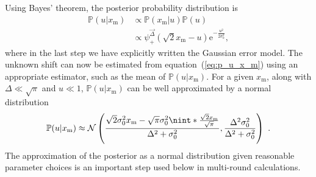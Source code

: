 \documentclass[prx,reprint,superscriptaddress,longbibliography,floatfix,nofootinbib]{revtex4-1}
\DeclarePairedDelimiter{\nint}\lfloor\rceil
\begin{document}
Using Bayes' theorem, the posterior probability distribution is
\begin{equation}
\begin{aligned}
\mathbb{P}(u|x_\text{m}) &\propto \mathbb{P}(x_\text{m}|u) \mathbb{P}(u) \\
&\propto \psi^{\vec{\Delta}}_{+}(\sqrt{2}x_\text{m} - u)\text{e}^{-\frac{u^2}{2\sigma_0^2}},
\end{aligned}
\label{eq:p_u_x_m}
\end{equation}
where in the last step we have explicitly written the Gaussian error model. The unknown shift can now be estimated from equation~(\ref{eq:p_u_x_m}) using an appropriate estimator, such as the mean of $\mathbb{P}(u|x_\text{m})$. For a given $x_\text{m}$, along with $\Delta \ll \sqrt{\pi}$ and $u \ll 1$, $\mathbb{P}(u|x_\text{m})$ can be well approximated by a normal distribution
\begin{equation}
    \mathbb{P}(u|x_\text{m}) \approx \mathcal{N}\left(\frac{\sqrt{2} \sigma_0^2 x_\text{m} - \sqrt{\pi} \sigma_0^2  \nint*{\frac{\sqrt{2}x_\text{m}}{\sqrt{\pi}}}}{\Delta^2 + \sigma_0^2}, \frac{\Delta^2\sigma_0^2}{\Delta^2 + \sigma_0^2}\right) \ .
\end{equation}
\noindent The approximation of the posterior as a normal distribution given reasonable parameter choices is an important step used below in multi-round calculations.
\end{document}
